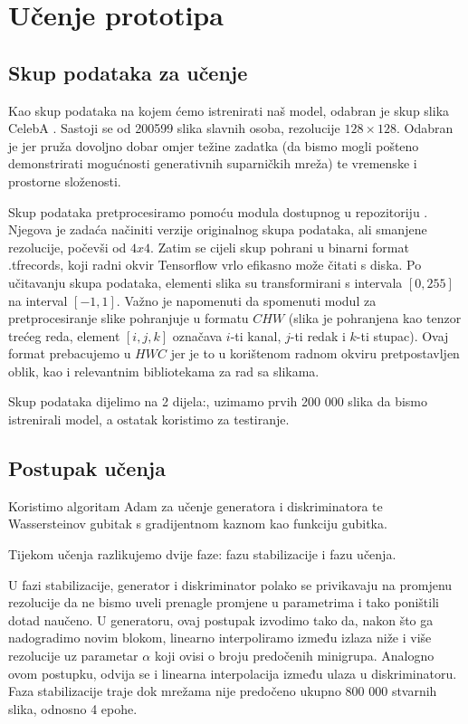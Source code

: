 \section{Učenje prototipa}

\subsection{Skup podataka za učenje}
Kao skup podataka na kojem ćemo istrenirati naš model, odabran je skup slika CelebA . Sastoji se od 200599 slika slavnih osoba, rezolucije $128 \times 128$. Odabran je jer pruža dovoljno dobar omjer težine zadatka (da bismo mogli pošteno demonstrirati mogućnosti generativnih suparničkih mreža) te vremenske i prostorne složenosti. 

Skup podataka pretprocesiramo pomoću modula dostupnog u repozitoriju . Njegova je zadaća načiniti verzije originalnog skupa podataka, ali smanjene rezolucije, počevši od $4x4$. Zatim se cijeli skup pohrani u binarni format .tfrecords, koji radni okvir Tensorflow vrlo efikasno može čitati s diska. Po učitavanju skupa podataka, elementi slika su transformirani s intervala $[0, 255]$  na interval $[-1, 1]$. Važno je napomenuti da spomenuti modul za pretprocesiranje slike pohranjuje u formatu $CHW$ (slika je pohranjena kao tenzor trećeg reda, element $[i, j, k]$ označava $i$-ti kanal, $j$-ti redak i $k$-ti stupac). Ovaj format prebacujemo u $HWC$ jer je to u korištenom radnom okviru pretpostavljen oblik, kao i relevantnim bibliotekama za rad sa slikama.

Skup podataka dijelimo na 2 dijela:, uzimamo prvih 200 000 slika da bismo istrenirali model, a ostatak koristimo za testiranje.

\subsection{Postupak učenja}
Koristimo algoritam Adam za učenje generatora i diskriminatora te Wassersteinov gubitak s gradijentnom kaznom kao funkciju gubitka. 

Tijekom učenja razlikujemo dvije faze: fazu stabilizacije i fazu učenja.

U fazi stabilizacije, generator i diskriminator polako se privikavaju na promjenu rezolucije da ne bismo uveli prenagle promjene u parametrima i tako poništili dotad naučeno. U generatoru, ovaj postupak izvodimo tako da, nakon što ga nadogradimo novim blokom, linearno interpoliramo između izlaza niže i više rezolucije uz parametar $\alpha$ koji ovisi o broju predočenih minigrupa.  Analogno ovom postupku, odvija se i linearna interpolacija između ulaza u diskriminatoru. Faza stabilizacije traje dok mrežama nije predočeno ukupno 800 000 stvarnih slika, odnosno 4 epohe.

